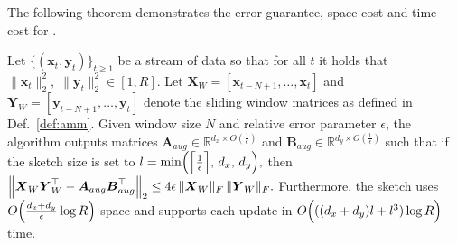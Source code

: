         


The following theorem demonstrates the error guarantee, space cost and time cost for \newsolution.
\vspace{-1mm}
\begin{theorem}\label{thm:socod-unnormalized}
Let \(\{(\boldsymbol{x}_t,\boldsymbol{y}_t)\}_{t\ge1}\) be a stream of data so that for all \(t\) it holds that
\(
\|\boldsymbol{x}_t\|_2^2,\;\|\boldsymbol{y}_t\|_2^2\in[1,R]
\). Let 
\(
\boldsymbol{X}_W = [\boldsymbol{x}_{t-N+1},\dots,\boldsymbol{x}_t]
\)
and 
\(
\boldsymbol{Y}_W = [\boldsymbol{y}_{t-N+1},\dots,\boldsymbol{y}_t]
\)
denote the sliding window matrices as defined in Def.~\ref{def:amm}. Given window size \(N\) and relative error parameter \(\epsilon\), the \newsolution algorithm outputs matrices
\(
\boldsymbol{A}_{aug}\in\mathbb{R}^{d_x\times O(\frac{1}{\epsilon})}
\)
and 
\(
\boldsymbol{B}_{aug}\in\mathbb{R}^{d_y\times O(\frac{1}{\epsilon})}
\)
such that if the sketch size is set to 
\(
l = \min\Bigl(\Bigl\lceil\frac{1}{\epsilon}\Bigr\rceil,\, d_x,\, d_y\Bigr),
\)
then
\(
\Bigl\|\boldsymbol{X}_W\boldsymbol{Y}_W^\top - \boldsymbol{A}_{aug}\boldsymbol{B}_{aug}^\top\Bigr\|_2 \le 4\epsilon\,\|\boldsymbol{X}_W\|_F\,\|\boldsymbol{Y}_W\|_F.
\)
Furthermore, the \newsolution sketch uses 
\(
O\Bigl(\frac{d_x+d_y}{\epsilon}\log R\Bigr)
\)
space and supports each update in 
\(
O\Bigl(((d_x+d_y)l + l^3)\log R\Bigr)
\)
time.
\end{theorem}



     

    
\label{sec-analysis}
